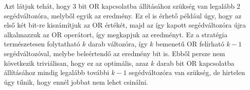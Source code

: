 Azt látjuk tehát, hogy 3 bit OR kapcsolatba állításához szükség van legalább 2 segédváltozóra, melyből egyik az eredmény. Ez el is érhető például úgy, hogy az első két bit-re kiszámítjuk az OR értékét, majd az így kapott segédváltozóra újra alkalmazzuk az OR operátort, így megkapjuk az eredményt. Ez a stratégia természetesen folytatható $k$ darab változóra, így $k$ bemenetű OR felírható $k-1$ segédváltozóval, melybe beleértendő az eredmény bit is. Ebből persze nem következik triviálisan, hogy ez az optimális, azaz $k$ darab bit OR kapcsolatba állításához mindig legalább további $k-1$ segédváltozóra van szükség, de hirtelen úgy tűnik, hogy ennél jobbat nem lehet csinálni.
